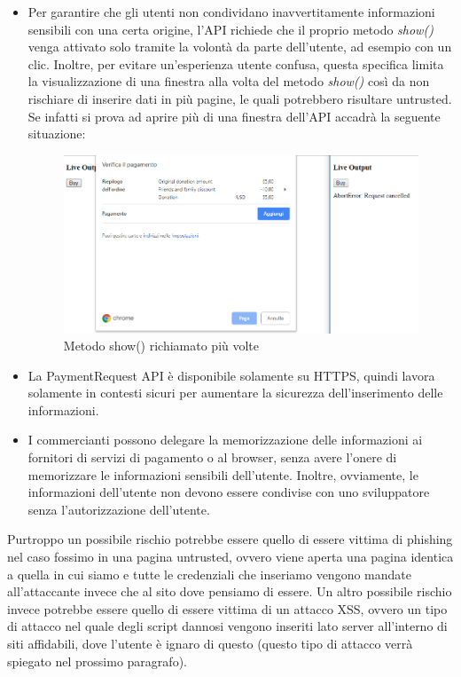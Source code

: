 \documentclass[11pt ,a4paper , twoside , openright ]{book}
\begin{document}
	\begin{itemize}
		\item Per garantire che gli utenti non condividano inavvertitamente informazioni sensibili con una certa origine, l'API richiede che il proprio metodo \textit{show()} venga attivato solo tramite la volontà da parte dell'utente, ad esempio con un clic. Inoltre, per evitare un'esperienza utente confusa, questa specifica limita la visualizzazione di una finestra alla volta del metodo \textit{show()} così da non rischiare di inserire dati in più pagine, le quali potrebbero risultare untrusted. 
		Se infatti si prova ad aprire più di una finestra dell'API accadrà la seguente situazione:
		
		\begin{figure}[h]
			\centering
			\includegraphics[width=0.5\linewidth]{Buy}
			\caption{Metodo show() richiamato più volte}
			\label{fig: Metodo show() richiamato più volte}
		\end{figure}
		
		
		\item La PaymentRequest API è disponibile solamente su HTTPS, quindi lavora solamente in contesti sicuri per aumentare la sicurezza dell'inserimento delle informazioni. 
		
		\item I commercianti possono delegare la memorizzazione delle informazioni ai fornitori di servizi di pagamento o al browser, senza avere l'onere di memorizzare le informazioni sensibili dell'utente. Inoltre, ovviamente, le informazioni dell'utente non devono essere condivise con uno sviluppatore senza l'autorizzazione dell'utente.
	\end{itemize}
	
	Purtroppo un possibile rischio potrebbe essere quello di essere vittima di phishing nel caso fossimo in una pagina untrusted, ovvero viene aperta una pagina identica a quella in cui siamo e tutte le credenziali che inseriamo vengono mandate all'attaccante invece che al sito dove pensiamo di essere. 
	Un altro possibile rischio invece potrebbe essere quello di essere vittima di un attacco XSS, ovvero un tipo di attacco nel quale degli script dannosi vengono inseriti lato server all'interno di siti affidabili, dove l'utente è ignaro di questo (questo tipo di attacco verrà spiegato nel prossimo paragrafo).
	
\end{document}

